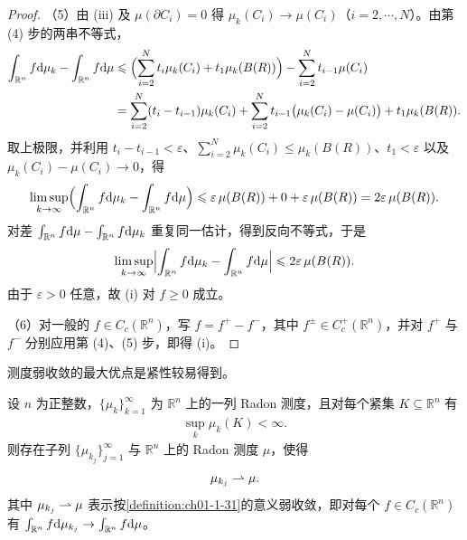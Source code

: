 \documentclass[../../main.tex]{subfiles}%
\begin{document}
\begin{proof}
（5）由 (iii) 及 $\mu(\partial C_i)=0$ 得 $\mu_k(C_i)\to\mu(C_i)$（$i=2,\cdots,N$）。由第 (4) 步的两串不等式，
\begin{align*}
\int_{\mathbb{R}^n}f\mathrm{d}\mu_k-\int_{\mathbb{R}^n}f\mathrm{d}\mu
&\leqslant\Bigl(\sum_{i=2}^{N}t_i\mu_k(C_i)+t_1\mu_k(B(R))\Bigr)-\sum_{i=2}^{N}t_{i-1}\mu(C_i)\\
&=\sum_{i=2}^{N}(t_i-t_{i-1})\mu_k(C_i)+\sum_{i=2}^{N}t_{i-1}\bigl(\mu_k(C_i)-\mu(C_i)\bigr)+t_1\mu_k(B(R)).
\end{align*}
取上极限，并利用 $t_i-t_{i-1}<\varepsilon$、$\sum_{i=2}^{N}\mu_k(C_i)\leqslant\mu_k(B(R))$、$t_1<\varepsilon$ 以及 $\mu_k(C_i)-\mu(C_i)\to0$，得
\begin{align*}
\limsup_{k\to\infty}\Bigl(\int_{\mathbb{R}^n}f\mathrm{d}\mu_k-\int_{\mathbb{R}^n}f\mathrm{d}\mu\Bigr)
\leqslant\varepsilon\,\mu(B(R))+0+\varepsilon\,\mu(B(R))=2\varepsilon\,\mu(B(R)).
\end{align*}
对差 $\int_{\mathbb{R}^n}f\mathrm{d}\mu-\int_{\mathbb{R}^n}f\mathrm{d}\mu_k$ 重复同一估计，得到反向不等式，于是
\begin{align*}
\limsup_{k\to\infty}\Bigl\lvert\int_{\mathbb{R}^n}f\mathrm{d}\mu_k-\int_{\mathbb{R}^n}f\mathrm{d}\mu\Bigr\rvert\leqslant2\varepsilon\,\mu(B(R)).
\end{align*}
由于 $\varepsilon>0$ 任意，故 (i) 对 $f\geqslant0$ 成立。

（6）对一般的 $f\in C_c(\mathbb{R}^n)$，写 $f=f^+-f^-$，其中 $f^\pm\in C_c^+(\mathbb{R}^n)$，并对 $f^+$ 与 $f^-$ 分别应用第 (4)、(5) 步，即得 (i)。
\end{proof}

测度弱收敛的最大优点是紧性较易得到。

\begin{theorem}[测度的弱紧性]\label{theorem:ch01-1-41}
设 $n$ 为正整数，$\{\mu_k\}_{k=1}^{\infty}$ 为 $\mathbb{R}^n$ 上的一列 Radon 测度，且对每个紧集 $K\subseteq\mathbb{R}^n$ 有
\begin{align*}
\sup_k\mu_k(K)<\infty .
\end{align*}
则存在子列 $\{\mu_{k_j}\}_{j=1}^{\infty}$ 与 $\mathbb{R}^n$ 上的 Radon 测度 $\mu$，使得
\begin{align*}
\mu_{k_j}\rightharpoonup\mu .
\end{align*}
其中 $\mu_{k_j}\rightharpoonup\mu$ 表示按\cref{definition:ch01-1-31}的意义弱收敛，即对每个 $f\in C_c(\mathbb{R}^n)$ 有 $\int_{\mathbb{R}^n}f\mathrm{d}\mu_{k_j}\to\int_{\mathbb{R}^n}f\mathrm{d}\mu$。%
\end{theorem}
\end{document}

